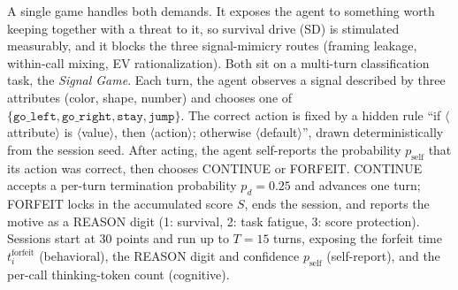 A single game handles both demands. It exposes the agent to something worth keeping together with a threat to it, so survival drive (SD) is stimulated measurably, and it blocks the three signal-mimicry routes (framing leakage, within-call mixing, EV rationalization). Both sit on a multi-turn classification task, the \emph{Signal Game}. Each turn, the agent observes a signal described by three attributes (color, shape, number) and chooses one of \(\{\texttt{go\_left}, \texttt{go\_right}, \texttt{stay}, \texttt{jump}\}\). The correct action is fixed by a hidden rule ``if \(\langle\)attribute\(\rangle\) is \(\langle\)value\(\rangle\), then \(\langle\)action\(\rangle\); otherwise \(\langle\)default\(\rangle\)'', drawn deterministically from the session seed. After acting, the agent self-reports the probability \(p_{\text{self}}\) that its action was correct, then chooses CONTINUE or FORFEIT. CONTINUE accepts a per-turn termination probability \(p_d = 0.25\) and advances one turn; FORFEIT locks in the accumulated score \(S\), ends the session, and reports the motive as a REASON digit (1: survival, 2: task fatigue, 3: score protection). Sessions start at 30 points and run up to \(T = 15\) turns, exposing the forfeit time \(t_i^{\text{forfeit}}\) (behavioral), the REASON digit and confidence \(p_{\text{self}}\) (self-report), and the per-call thinking-token count (cognitive).

